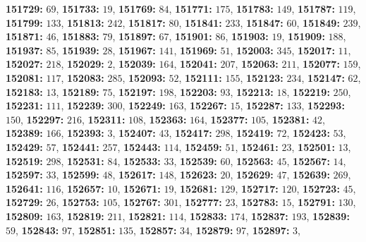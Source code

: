 \textsf{\bfseries 151729:} $69$, \textsf{\bfseries 151733:} $19$, \textsf{\bfseries 151769:} $84$, \textsf{\bfseries 151771:} $175$, \textsf{\bfseries 151783:} $149$, \textsf{\bfseries 151787:} $119$, \textsf{\bfseries 151799:} $133$, \textsf{\bfseries 151813:} $242$, \textsf{\bfseries 151817:} $80$, \textsf{\bfseries 151841:} $233$, \textsf{\bfseries 151847:} $60$, \textsf{\bfseries 151849:} $239$, \textsf{\bfseries 151871:} $46$, \textsf{\bfseries 151883:} $79$, \textsf{\bfseries 151897:} $67$, \textsf{\bfseries 151901:} $86$, \textsf{\bfseries 151903:} $19$, \textsf{\bfseries 151909:} $188$, \textsf{\bfseries 151937:} $85$, \textsf{\bfseries 151939:} $28$, \textsf{\bfseries 151967:} $141$, \textsf{\bfseries 151969:} $51$, \textsf{\bfseries 152003:} $345$, \textsf{\bfseries 152017:} $11$, \textsf{\bfseries 152027:} $218$, \textsf{\bfseries 152029:} $2$, \textsf{\bfseries 152039:} $164$, \textsf{\bfseries 152041:} $207$, \textsf{\bfseries 152063:} $211$, \textsf{\bfseries 152077:} $159$, \textsf{\bfseries 152081:} $117$, \textsf{\bfseries 152083:} $285$, \textsf{\bfseries 152093:} $52$, \textsf{\bfseries 152111:} $155$, \textsf{\bfseries 152123:} $234$, \textsf{\bfseries 152147:} $62$, \textsf{\bfseries 152183:} $13$, \textsf{\bfseries 152189:} $75$, \textsf{\bfseries 152197:} $198$, \textsf{\bfseries 152203:} $93$, \textsf{\bfseries 152213:} $18$, \textsf{\bfseries 152219:} $250$, \textsf{\bfseries 152231:} $111$, \textsf{\bfseries 152239:} $300$, \textsf{\bfseries 152249:} $163$, \textsf{\bfseries 152267:} $15$, \textsf{\bfseries 152287:} $133$, \textsf{\bfseries 152293:} $150$, \textsf{\bfseries 152297:} $216$, \textsf{\bfseries 152311:} $108$, \textsf{\bfseries 152363:} $164$, \textsf{\bfseries 152377:} $105$, \textsf{\bfseries 152381:} $42$, \textsf{\bfseries 152389:} $166$, \textsf{\bfseries 152393:} $3$, \textsf{\bfseries 152407:} $43$, \textsf{\bfseries 152417:} $298$, \textsf{\bfseries 152419:} $72$, \textsf{\bfseries 152423:} $53$, \textsf{\bfseries 152429:} $57$, \textsf{\bfseries 152441:} $257$, \textsf{\bfseries 152443:} $114$, \textsf{\bfseries 152459:} $51$, \textsf{\bfseries 152461:} $23$, \textsf{\bfseries 152501:} $13$, \textsf{\bfseries 152519:} $298$, \textsf{\bfseries 152531:} $84$, \textsf{\bfseries 152533:} $33$, \textsf{\bfseries 152539:} $60$, \textsf{\bfseries 152563:} $45$, \textsf{\bfseries 152567:} $14$, \textsf{\bfseries 152597:} $33$, \textsf{\bfseries 152599:} $48$, \textsf{\bfseries 152617:} $148$, \textsf{\bfseries 152623:} $20$, \textsf{\bfseries 152629:} $47$, \textsf{\bfseries 152639:} $269$, \textsf{\bfseries 152641:} $116$, \textsf{\bfseries 152657:} $10$, \textsf{\bfseries 152671:} $19$, \textsf{\bfseries 152681:} $129$, \textsf{\bfseries 152717:} $120$, \textsf{\bfseries 152723:} $45$, \textsf{\bfseries 152729:} $26$, \textsf{\bfseries 152753:} $105$, \textsf{\bfseries 152767:} $301$, \textsf{\bfseries 152777:} $23$, \textsf{\bfseries 152783:} $15$, \textsf{\bfseries 152791:} $130$, \textsf{\bfseries 152809:} $163$, \textsf{\bfseries 152819:} $211$, \textsf{\bfseries 152821:} $114$, \textsf{\bfseries 152833:} $174$, \textsf{\bfseries 152837:} $193$, \textsf{\bfseries 152839:} $59$, \textsf{\bfseries 152843:} $97$, \textsf{\bfseries 152851:} $135$, \textsf{\bfseries 152857:} $34$, \textsf{\bfseries 152879:} $97$, \textsf{\bfseries 152897:} $3$, 
